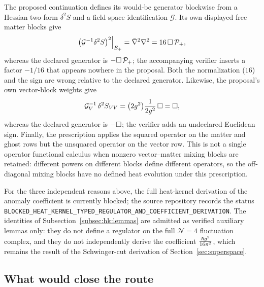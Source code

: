 The proposed continuation defines its would-be generator blockwise from a
Hessian two-form $\delta^2S$ and a field-space identification $\mathcal G$.
Its own displayed free matter blocks give
\begin{equation}\label{eq:hk:matter}
\big(\mathcal G^{-1}\delta^2S\big)^2\Big|_{E_+}
=\bar\nabla^2\nabla^2
=16\,\Box\,\mathcal P_+ ,
\end{equation}
whereas the declared generator is $-\Box\,\mathcal P_+$; the accompanying
verifier inserts a factor $-1/16$ that appears nowhere in the proposal. Both
the normalization ($16$) and the sign are wrong relative to the declared
generator. Likewise, the proposal's own vector-block weights give
\begin{equation}\label{eq:hk:vector}
\mathcal G_V^{-1}\,\delta^2S_{VV}
=\big(2g^2\big)\frac{1}{2g^2}\,\Box
=\Box ,
\end{equation}
whereas the declared generator is $-\Box$; the verifier adds an undeclared
Euclidean sign. Finally, the prescription applies the squared operator on the
matter and ghost rows but the unsquared operator on the vector row. This is
not a single operator functional calculus when nonzero vector--matter mixing
blocks are retained: different powers on different blocks define different
operators, so the off-diagonal mixing blocks have no defined heat evolution
under this prescription.

\begin{remark}\label{rem:hk:blocked}
For the three independent reasons above, the full heat-kernel derivation of
the anomaly coefficient is currently blocked; the source repository records
the status
\texttt{BLOCKED\_HEAT\_KERNEL\_TYPED\_REGULATOR\_AND\_COEFFICIENT\_DERIVATION}.
The identities of Subsection~\ref{subsec:hk:lemmas} are admitted as verified
auxiliary lemmas only: they do not define a regulator on the full
$\mathcal N=4$ fluctuation complex, and they do not independently derive the
coefficient $\frac{\hbar g^2}{16\pi^2}$, which remains the result of the
Schwinger-cut derivation of Section~\ref{sec:superspace}.
\end{remark}

\subsection{What would close the route}\label{subsec:hk:closure}

